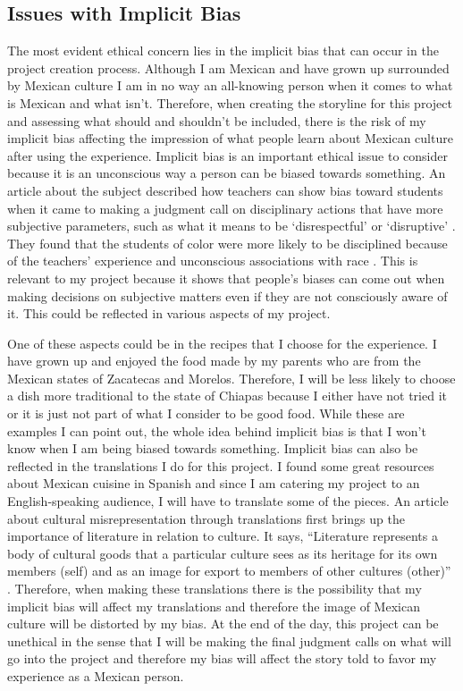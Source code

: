 \documentclass[11pt,twocolumn]{article}
\begin{document}
\subsection{Issues with Implicit Bias}
The most evident ethical concern lies in the implicit bias that can occur in the project creation process. Although I am Mexican and have grown up surrounded by Mexican culture I am in no way an all-knowing person when it comes to what is Mexican and what isn’t. Therefore, when creating the storyline for this project and assessing what should and shouldn’t be included, there is the risk of my implicit bias affecting the impression of what people learn about Mexican culture after using the experience. Implicit bias is an important ethical issue to consider because it is an unconscious way a person can be biased towards something. An article about the subject described how teachers can show bias toward students when it came to making a judgment call on disciplinary actions that have more subjective parameters, such as what it means to be ‘disrespectful’ or ‘disruptive’ \cite{implicitbias201516}. They found that the students of color were more likely to be disciplined because of the teachers’ experience and unconscious associations with race \cite{implicitbias201516}. This is relevant to my project because it shows that people's biases can come out when making decisions on subjective matters even if they are not consciously aware of it. This could be reflected in various aspects of my project. 

One of these aspects could be in the recipes that I choose for the experience. I have grown up and enjoyed the food made by my parents who are from the Mexican states of Zacatecas and Morelos. Therefore, I will be less likely to choose a dish more traditional to the state of Chiapas because I either have not tried it or it is just not part of what I consider to be good food. While these are examples I can point out, the whole idea behind implicit bias is that I won't know when I am being biased towards something. Implicit bias can also be reflected in the translations I do for this project. I found some great resources about Mexican cuisine in Spanish and since I am catering my project to an English-speaking audience, I will have to translate some of the pieces. An article about cultural misrepresentation through translations first brings up the importance of literature in relation to culture. It says, “Literature represents a body of cultural goods that a particular culture sees as its heritage for its own members (self) and as an image for export to members of other cultures (other)” \cite{translationmisrep2008}. Therefore, when making these translations there is the possibility that my implicit bias will affect my translations and therefore the image of Mexican culture will be distorted by my bias. At the end of the day, this project can be unethical in the sense that I will be making the final judgment calls on what will go into the project and therefore my bias will affect the story told to favor my experience as a Mexican person. 
 
\end{document}
